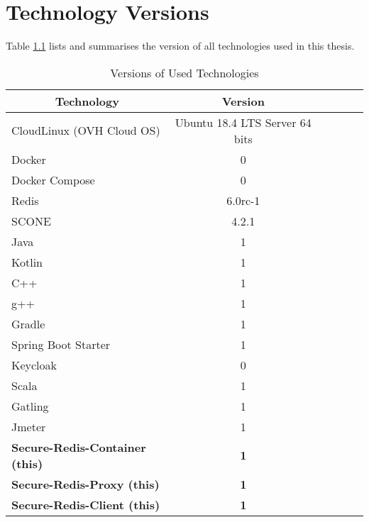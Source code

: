 \chapter{Technology Versions}
\label{ann:technology_versions}

Table \ref{tab:versions_of_used_technologies} lists and summarises the version of all technologies used in this thesis.

\begin{table}[ht]
	\caption{Versions of Used Technologies}
	\label{tab:versions_of_used_technologies}
\centering
\begin{tabular}{lccccc}
	\toprule
	\multicolumn{1}{c}{\textbf{Technology}} 	& \multicolumn{1}{c}{\textbf{Version}} \\
	\midrule
		CloudLinux (OVH Cloud OS) 			& 		Ubuntu 18.4 LTS Server 64 bits 	\\
		Docker								& 		0	 							\\
		Docker Compose						& 		0	 							\\
		Redis								& 		6.0rc-1 							\\
		SCONE 								& 		4.2.1 							\\
		Java 								& 		1								\\
		Kotlin 								& 		1								\\
		C++									& 		1								\\
		g++									& 		1								\\
		Gradle								&		1								\\
		Spring Boot Starter					& 		1								\\
		Keycloak							& 		0								\\
		Scala								& 		1								\\
		Gatling								& 		1								\\
		Jmeter								&		1								\\
	\midrule
	\textbf{Secure-Redis-Container (this)}	&		\textbf{1}						\\
	\textbf{Secure-Redis-Proxy (this)}		&		\textbf{1}						\\
	\textbf{Secure-Redis-Client	(this)}		&		\textbf{1}						\\
	\bottomrule
\end{tabular}
\end{table}


